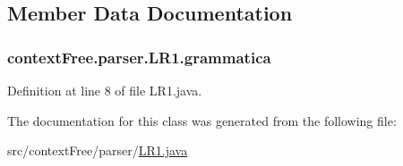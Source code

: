 \subsection{Member Data Documentation}
\hypertarget{classcontext_free_1_1parser_1_1_l_r1_a1639494e6b5ede7a4e9b6e4c24fd1702}{
\subsubsection[{grammatica}]{ {\bf context\-Free.\-parser.\-L\-R1.\-grammatica}}}\label{classcontext_free_1_1parser_1_1_l_r1_a1639494e6b5ede7a4e9b6e4c24fd1702}


Definition at line 8 of file L\-R1.\-java.



The documentation for this class was generated from the following file\-:\begin{DoxyCompactItemize}
\item 
src/context\-Free/parser/\hyperlink{_l_r1_8java}{L\-R1.\-java}\end{DoxyCompactItemize}
